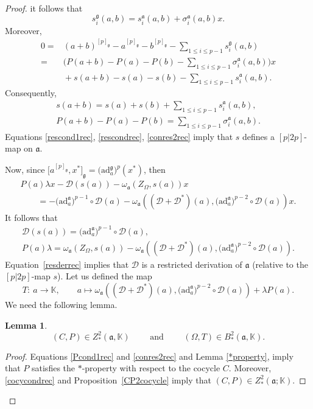 \documentclass[10pt,a4paper]{amsart}
\numberwithin{equation}{section}
\newtheorem{Lemma}[Theorem]{Lemma}
\begin{document}
\begin{proof}
it follows that
\[
s^\mathfrak{g}_i(a,b)=s_i^{\mathfrak{a}}(a,b)+\sigma_i^{\mathfrak{a}}(a,b)x.
\]
Moreover,
\begin{align*}
0={}&(a+b)^{[p]_\mathfrak{g}}-a^{[p]_\mathfrak{g}}-b^{[p]_\mathfrak{g}}- \sum_{1\leq i \leq p-1}s_i^\mathfrak{g}(a,b)\\
={}&\bigg( P(a+b)-P(a)-P(b)- \sum_{1\leq i \leq p-1}\sigma_i^{\mathfrak{a}}(a,b) \bigg) x\\
&{}+s(a+b)-s(a)-s(b)- \sum_{1\leq i \leq p-1}s_i^{\mathfrak{a}}(a,b).
\end{align*}
Consequently,
\begin{gather}
s(a+b)=s(a)+s(b)+ \sum_{1\leq i \leq p-1}s_i^{\mathfrak{a}}(a,b), \label{conres2rec}\\
P(a+b)-P(a)-P(b)= \sum_{1\leq i \leq p-1}\sigma_i^{\mathfrak{a}}(a,b).\nonumber %
 \end{gather}
Equations \eqref{rescond1rec}, \eqref{rescondrec}, \eqref{conres2rec} imply that $s$ defines a $[p|2p]$-map on $\mathfrak{a}$.


Now, since $\big[a^{[p]_\mathfrak{g}},x^*\big]_\mathfrak{g}=\bigl(\mathrm{ad}_a^\mathfrak{g}\bigr)^p(x^*)$, then
\begin{gather*}
P(a) \lambda x-\mathscr D (s(a)) - \omega_\mathfrak{a} (Z_\Omega, s(a))x \\
\qquad{} = - \bigl(\mathrm{ad}_a^\mathfrak{a}\bigr)^{p-1}\circ \mathscr D(a) - \omega_\mathfrak{a} (({\mathscr D}+{\mathscr D}^*)(a), \bigl(\mathrm{ad}_a^\mathfrak{a}\bigr)^{p-2} \circ {\mathscr D}(a))x.
\end{gather*}
It follows that
\begin{gather}
\mathscr D (s(a)) = \bigl(\mathrm{ad}_a^\mathfrak{a}\bigr)^{p-1}\circ \mathscr D(a),\label{resderrec} \\
P(a) \lambda = \omega_\mathfrak{a} (Z_\Omega, s(a)) - \omega_\mathfrak{a} (({\mathscr D}+{\mathscr D}^*)(a),\bigl(\mathrm{ad}_a^\mathfrak{a}\bigr)^{p-2} \circ {\mathscr D}(a)).\label{Pcbound}
\end{gather}
Equation~\eqref{resderrec} implies that ${\mathscr D}$ is a restricted derivation of $\mathfrak{a}$ (relative to the $[p|2p]$-map $s$). Let us defined the map
\[
T\colon\ a\rightarrow \mathbb K, \qquad a \mapsto \omega_\mathfrak{a} (({\mathscr D}+{\mathscr D}^*)(a),\bigl(\mathrm{ad}_a^\mathfrak{a}\bigr)^{p-2} \circ {\mathscr D}(a)) + \lambda P(a).
\]
We need the following lemma.
\begin{Lemma}
\[
(C,P)\in Z^2_{*} (\mathfrak{a}, \mathbb K)\qquad \text{ and }\qquad(\Omega,T)\in B^2_{*} (\mathfrak{a}, \mathbb K).
\]
\end{Lemma}
\begin{proof}
Equations \eqref{Pcond1rec} and \eqref{conres2rec} and Lemma \ref{*property}, imply that $P$ satisfies the $*$-property with respect to the cocycle $C$. Moreover, \eqref{cocycondrec} and Proposition~\ref{CP2cocycle} imply that $(C, P)\in Z^2_* (\mathfrak{a}; \mathbb K)$.


\end{proof}
\end{proof}
\end{document}
